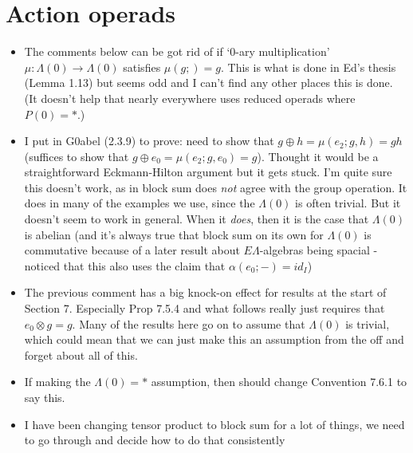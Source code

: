 \documentclass{amsart}
\begin{document}
\section{Action operads}
\begin{itemize}
\item The comments below can be got rid of if `$0$-ary multiplication' $\mu \colon \Lambda(0) \rightarrow \Lambda(0)$ satisfies $\mu(g; ) = g$. This is what is done in Ed's thesis (Lemma 1.13) but seems odd and I can't find any other places this is done. (It doesn't help that nearly everywhere uses reduced operads where $P(0) = \ast$.)
\item I put in G0abel (2.3.9) to prove: need to show that $g \oplus h = \mu(e_2;g,h) = gh$ (suffices to show that $g \oplus e_0 = \mu(e_2;g, e_0) = g$). Thought it would be a straightforward Eckmann-Hilton argument but it gets stuck. I'm quite sure this doesn't work, as in block sum does \textit{not} agree with the group operation. It does in many of the examples we use, since the $\Lambda(0)$ is often trivial. But it doesn't seem to work in general. When it \textit{does}, then it is the case that $\Lambda(0)$ is abelian (and it's always true that block sum on its own for $\Lambda(0)$ is commutative because of a later result about $E\Lambda$-algebras being spacial - noticed that this also uses the claim that $\alpha(e_0;-) = id_I$)
\item The previous comment has a big knock-on effect for results at the start of Section 7. Especially Prop 7.5.4 and what follows really just requires that $e_0 \otimes g = g$. Many of the results here go on to assume that $\Lambda(0)$ is trivial, which could mean that we can just make this an assumption from the off and forget about all of this.
\item If making the $\Lambda(0) = \ast$ assumption, then should change Convention 7.6.1 to say this.
\item I have been changing tensor product to block sum for a lot of things, we need to go through and decide how to do that consistently

\end{itemize}
\end{document}
